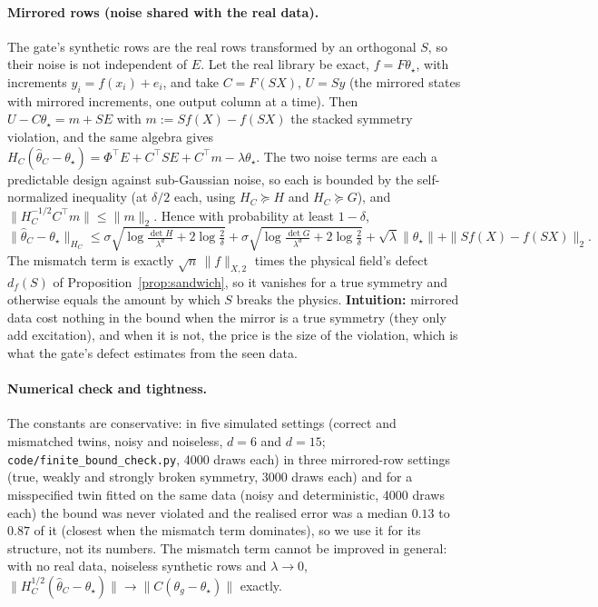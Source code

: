 \paragraph{Mirrored rows (noise shared with the real data).} The gate's synthetic rows are the real rows transformed by an orthogonal $S$, so their noise is not independent of $E$. Let the real library be exact, $f=F\theta_\star$, with increments $y_i=f(x_i)+e_i$, and take $C=F(SX)$, $U=Sy$ (the mirrored states with mirrored increments, one output column at a time). Then $U-C\theta_\star=m+SE$ with $m:=Sf(X)-f(SX)$ the stacked symmetry violation, and the same algebra gives $H_C(\widehat\theta_C-\theta_\star)=\Phi^\top E+C^\top SE+C^\top m-\lambda\theta_\star$. The two noise terms are each a predictable design against sub-Gaussian noise, so each is bounded by the self-normalized inequality (at $\delta/2$ each, using $H_C\succeq H$ and $H_C\succeq G$), and $\|H_C^{-1/2}C^\top m\|\le\|m\|_2$. Hence with probability at least $1-\delta$,
\[
\|\widehat\theta_C-\theta_\star\|_{H_C}\le\sigma\sqrt{\log\tfrac{\det H}{\lambda^{d}}+2\log\tfrac2\delta}+\sigma\sqrt{\log\tfrac{\det G}{\lambda^{d}}+2\log\tfrac2\delta}+\sqrt\lambda\|\theta_\star\|+\|Sf(X)-f(SX)\|_2 .
\]
The mismatch term is exactly $\sqrt n\,\|f\|_{X,2}$ times the physical field's defect $d_f(S)$ of Proposition~\ref{prop:sandwich}, so it vanishes for a true symmetry and otherwise equals the amount by which $S$ breaks the physics. \textbf{Intuition:} mirrored data cost nothing in the bound when the mirror is a true symmetry (they only add excitation), and when it is not, the price is the size of the violation, which is what the gate's defect estimates from the seen data.

\paragraph{Numerical check and tightness.} The constants are conservative: in five simulated settings (correct and mismatched twins, noisy and noiseless, $d=6$ and $d=15$; \texttt{code/\allowbreak finite\_\allowbreak bound\_\allowbreak check.py}, 4000 draws each) in three mirrored-row settings (true, weakly and strongly broken symmetry, 3000 draws each) and for a misspecified twin fitted on the same data (noisy and deterministic, 4000 draws each) the bound was never violated and the realised error was a median $0.13$ to $0.87$ of it (closest when the mismatch term dominates), so we use it for its structure, not its numbers. The mismatch term cannot be improved in general: with no real data, noiseless synthetic rows and $\lambda\to0$, $\|H_C^{1/2}(\widehat\theta_C-\theta_\star)\|\to\|C(\theta_g-\theta_\star)\|$ exactly.

